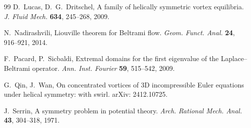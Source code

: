 \documentclass[12pt,reqno]{amsart}
\numberwithin{equation}{section}
\theoremstyle{definition}
\theoremstyle{remark}
\begin{document}
\begin{thebibliography}{99}
D.\ Lucas, D.\ G.\ Dritschel, A family of helically symmetric vortex equilibria. \textit{J. Fluid Mech.} \textbf{634}, 245--268, 2009.

N.\ Nadirashvili, Liouville theorem for Beltrami flow.
\textit{Geom. Funct. Anal.} \textbf{24}, 916--921, 2014.

F.\ Pacard, P.\ Sicbaldi, Extremal domains for the first eigenvalue of the Laplace--Beltrami operator.
\textit{Ann. Inst. Fourier} \textbf{59}, 515--542, 2009.

G.\ Qin, J.\ Wan, On concentrated vortices of 3D incompressible Euler equations under helical symmetry: with swirl. arXiv: 2412.10725.

J.\ Serrin, A symmetry problem in potential theory.
\textit{Arch. Rational Mech. Anal.} \textbf{43}, 304--318, 1971.
	\end{thebibliography}		
\end{document}
